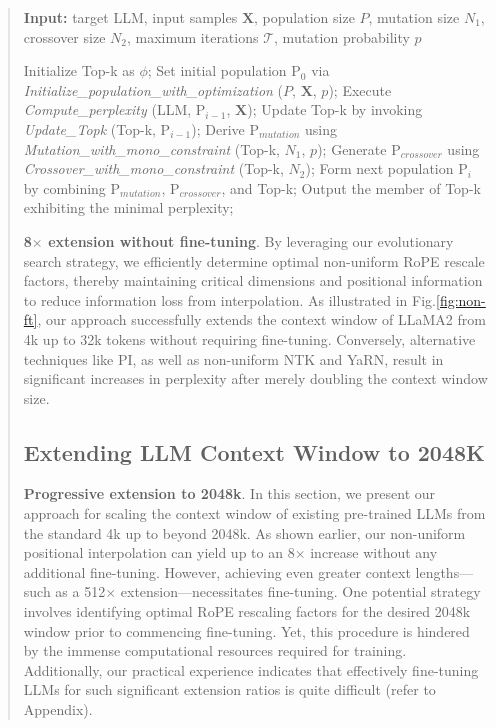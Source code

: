 \begin{abstract}
\begin{algorithm}[t]
	\small
	\caption{The search algorithm}
	\textbf{Input:} target LLM, input samples $\mathbf{X}$, population size $P$, mutation size $N_1$, crossover size $N_2$, maximum iterations $\mathcal{T}$, mutation probability $p$\\

	\begin{algorithmic}[1]
		\label{alg:search}
		\STATE Initialize Top-k as $\phi$;
		\STATE Set initial population $\text{P}_0$ via \textit{Initialize\_population\_with\_optimization} ($P$, $\mathbf{X}$, $p$); 
		\STATE Execute \textit{Compute\_perplexity} (LLM, $\text{P}_{i-1}$, $\mathbf{X}$);
		\STATE  Update Top-k by invoking \textit{Update\_Topk} (Top-k, $\text{P}_{i-1}$);
		\STATE Derive $\text{P}_{mutation}$ using \textit{Mutation\_with\_mono\_constraint} (Top-k, $N_1$, $p$); 
		\STATE Generate $\text{P}_{crossover}$ using \textit{Crossover\_with\_mono\_constraint} (Top-k, $N_2$);
		\STATE Form next population $\text{P}_i$ by combining $\text{P}_{mutation}$, $\text{P}_{crossover}$, and Top-k;
		\ENDFOR
		\STATE Output the member of Top-k exhibiting the minimal perplexity;
	\end{algorithmic}
\end{algorithm}

\textbf{8$\times$ extension without fine-tuning}. By leveraging our evolutionary search strategy, we efficiently determine optimal non-uniform RoPE rescale factors, thereby maintaining critical dimensions and positional information to reduce information loss from interpolation. As illustrated in Fig.\ref{fig:non-ft}, our approach successfully extends the context window of LLaMA2 from 4k up to 32k tokens without requiring fine-tuning. Conversely, alternative techniques like PI, as well as non-uniform NTK and YaRN, result in significant increases in perplexity after merely doubling the context window size.

\subsection{Extending LLM Context Window to 2048K}
\label{sec:extendto2048k}

\textbf{Progressive extension to 2048k}. In this section, we present our approach for scaling the context window of existing pre-trained LLMs from the standard 4k up to beyond 2048k. As shown earlier, our non-uniform positional interpolation can yield up to an 8$\times$ increase without any additional fine-tuning. However, achieving even greater context lengths—such as a 512$\times$ extension—necessitates fine-tuning. One potential strategy involves identifying optimal RoPE rescaling factors for the desired 2048k window prior to commencing fine-tuning. Yet, this procedure is hindered by the immense computational resources required for training. Additionally, our practical experience indicates that effectively fine-tuning LLMs for such significant extension ratios is quite difficult (refer to Appendix).


\end{abstract}
